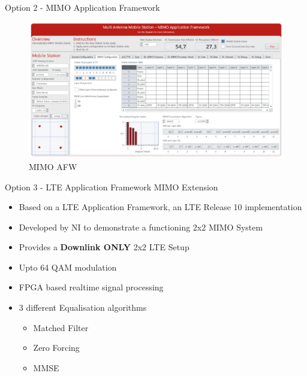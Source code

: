 \documentclass[10pt,t]{beamer}
\begin{document}
\begin{frame}{Option 2 - MIMO Application Framework}
    \begin{figure}[H]
        \centering
        \includegraphics[width=\linewidth]{../images/MIMOAFWScreen.png}
        \caption{MIMO AFW}
    \end{figure}
\end{frame}

\begin{frame}{Option 3 - LTE Application Framework MIMO Extension}
    \begin{itemize}
        \item Based on a LTE Application Framework, an LTE Release 10 implementation
            \bigskip
        \item Developed by NI to demonstrate a functioning 2x2 MIMO System
            \bigskip
        \item Provides a \textbf{Downlink ONLY} 2x2 LTE Setup
            \bigskip
        \item Upto 64 QAM modulation
            \bigskip
        \item FPGA based realtime signal processing
            \bigskip
        \item 3 different Equalisation algorithms
            \begin{itemize}
                \item Matched Filter
                \item Zero Forcing
                \item MMSE
            \end{itemize}
    \end{itemize}
\end{frame}
\end{document}

